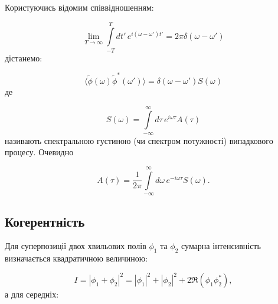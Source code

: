 Користуючись відомим співвідношенням:

\begin{equation*}
	\lim_{T \to \infty} \int\limits_{-T}^{T} dt' \, e^{i(\omega - \omega')t'} = 2\pi \delta(\omega - \omega')
\end{equation*}
дістанемо:

\begin{equation}
	\langle \tilde\phi(\omega) \tilde\phi^{*}(\omega') \rangle = \delta(\omega - \omega') S(\omega)
	\label{eq:spectral_density}
\end{equation}
де

\begin{equation*}
	S(\omega) = \int\limits_{-\infty}^{\infty} d\tau \, e^{i\omega \tau} A(\tau)
\end{equation*}
називають спектральною густиною (чи спектром потужності) випадкового процесу. Очевидно

\begin{equation*}
	A(\tau) = \frac{1}{2\pi} \int\limits_{-\infty}^{\infty} d\omega \, e^{-i\omega \tau} S(\omega).
\end{equation*}

\subsection*{Когерентність}

Для суперпозиції двох хвильових полів \(\phi_1\) та \(\phi_2\) сумарна інтенсивність визначається квадратичною
величиною:

\begin{equation*}
	I = |\phi_1 + \phi_2|^2 = |\phi_1|^2 + |\phi_2|^2 + 2 \Re(\phi_1 \phi_2^{*}),
\end{equation*}
%
а для середніх:


